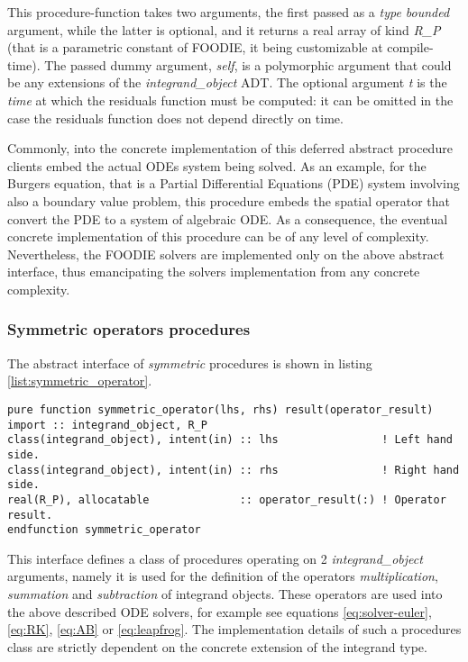 This procedure-function takes two arguments, the first passed as a \emph{type bounded} argument, while the latter is optional, and it returns a real array of kind \emph{R\_P} (that is a parametric constant of FOODIE, it being customizable at compile-time). The passed dummy argument, \emph{self}, is a polymorphic argument that could be any extensions of the \emph{integrand\_object} ADT. The optional argument \emph{t} is the \emph{time} at which the residuals function must be computed: it can be omitted in the case the residuals function does not depend directly on time.

Commonly, into the concrete implementation of this deferred abstract procedure clients embed the actual ODEs system being solved. As an example, for the Burgers equation, that is a Partial Differential Equations (PDE) system involving also a boundary value problem, this procedure embeds the spatial operator that convert the PDE to a system of algebraic ODE. As a consequence, the eventual concrete implementation of this procedure can be of any level of complexity. Nevertheless, the FOODIE solvers are implemented only on the above abstract interface, thus emancipating the solvers implementation from any concrete complexity.

\subsubsection{Symmetric operators procedures}

The abstract interface of \emph{symmetric} procedures is shown in listing \ref{list:symmetric_operator}.

\begin{lstlisting}[firstnumber=1,style=code,caption={symmetric operator procedure interface},label={list:symmetric_operator}]
pure function symmetric_operator(lhs, rhs) result(operator_result)
import :: integrand_object, R_P
class(integrand_object), intent(in) :: lhs                ! Left hand side.
class(integrand_object), intent(in) :: rhs                ! Right hand side.
real(R_P), allocatable              :: operator_result(:) ! Operator result.
endfunction symmetric_operator
\end{lstlisting}

This interface defines a class of procedures operating on 2 \emph{integrand\_object} arguments, namely it is used for the definition of the operators \emph{multiplication}, \emph{summation} and \emph{subtraction} of integrand objects. These operators are used into the above described ODE solvers, for example see equations \ref{eq:solver-euler}, \ref{eq:RK}, \ref{eq:AB} or \ref{eq:leapfrog}. The implementation details of such a procedures class are strictly dependent on the concrete extension of the integrand type.

